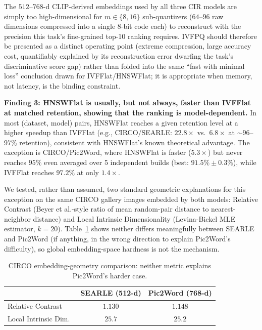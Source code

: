 \documentclass[conference]{IEEEtran}
\begin{document}
The $512$--$768$-d CLIP-derived embeddings used by all three CIR models are simply too high-dimensional for $m\in\{8,16\}$ sub-quantizers ($64$--$96$ raw dimensions compressed into a single 8-bit code each) to reconstruct with the precision this task's fine-grained top-10 ranking requires. IVFPQ should therefore be presented as a distinct operating point (extreme compression, large accuracy cost, quantifiably explained by its reconstruction error dwarfing the task's discriminative score gap) rather than folded into the same ``fast with minimal loss'' conclusion drawn for IVFFlat/HNSWFlat; it is appropriate when memory, not latency, is the binding constraint.

\vspace{0.05cm}
\noindent\textbf{Finding 3: HNSWFlat is usually, but not always, faster than IVFFlat at matched retention, showing that the ranking is model-dependent.} In most (dataset, model) pairs, HNSWFlat reaches a given retention level at a higher speedup than IVFFlat (e.g., CIRCO/SEARLE: $22.8\times$ vs.\ $6.8\times$ at $\sim\!96$--$97\%$ retention), consistent with HNSWFlat's known theoretical advantage. The exception is CIRCO/Pic2Word, where HNSWFlat is faster ($5.3\times$) but never reaches $95\%$ even averaged over 5 independent builds (best: $91.5\%\pm0.3\%$), while IVFFlat reaches $97.2\%$ at only $1.4\times$.

We tested, rather than assumed, two standard geometric explanations for this exception on the same CIRCO gallery images embedded by both models: Relative Contrast (Beyer et al.-style ratio of mean random-pair distance to nearest-neighbor distance) and Local Intrinsic Dimensionality (Levina-Bickel MLE estimator, $k{=}20$). Table~\ref{tab:geometry} shows neither differs meaningfully between SEARLE and Pic2Word (if anything, in the wrong direction to explain Pic2Word's difficulty), so global embedding-space hardness is not the mechanism.

\begin{table}[!ht]
\centering
\caption{CIRCO embedding-geometry comparison: neither metric explains Pic2Word's harder case.}
\label{tab:geometry}
\renewcommand{\arraystretch}{0.8}
\begin{tabular*}{\linewidth}{@{\extracolsep{\fill}}lcc}
\toprule
& \textbf{SEARLE} (512-d) & \textbf{Pic2Word} (768-d) \\
\midrule
Relative Contrast & $1.130$ & $1.148$ \\
Local Intrinsic Dim.\ & $25.7$ & $25.2$ \\
\bottomrule
\end{tabular*}
\end{table}
\end{document}
